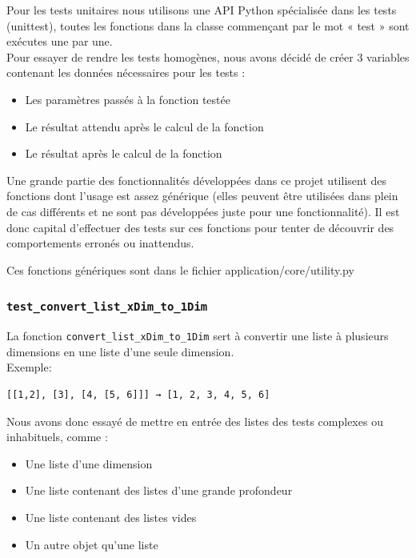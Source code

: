 \documentclass[17pts]{report}
\begin{document}
Pour les tests unitaires nous utilisons une API Python spécialisée dans les
tests (unittest), toutes les fonctions dans la classe commençant par le mot «
test » sont exécutes une par une.\\

Pour essayer de rendre les tests homogènes, nous avons décidé de créer 3
variables contenant les données nécessaires pour les tests :
\begin{itemize}
    \item Les paramètres passés à la fonction testée
    \item Le résultat attendu après le calcul de la fonction
    \item Le résultat après le calcul de la fonction
\end{itemize}

Une grande partie des fonctionnalités développées dans ce projet utilisent des
fonctions dont l'usage est assez générique (elles peuvent être utilisées dans
plein de cas différents et ne sont pas développées juste pour une
fonctionnalité). Il est donc capital d'effectuer des tests sur ces fonctions
pour tenter de découvrir des comportements erronés ou inattendus.

Ces fonctions génériques sont dans le fichier application/core/utility.py

\subsubsection{\texttt{test\_convert\_list\_xDim\_to\_1Dim}}
\label{ssub:ConvertListXDIMto1DIM}
La fonction \verb|convert_list_xDim_to_1Dim| sert à convertir une liste à
plusieurs dimensions en une liste d'une seule dimension.
\\
Exemple:
\begin{verbatim}
[[1,2], [3], [4, [5, 6]]] → [1, 2, 3, 4, 5, 6]
\end{verbatim}

Nous avons donc essayé de mettre en entrée des listes des tests complexes ou
inhabituels, comme :
\begin{itemize}
    \item Une liste d’une dimension
    \item Une liste contenant des listes d'une grande profondeur
    \item Une liste contenant des listes vides
    \item Un autre objet qu'une liste
\end{itemize}
\end{document}
